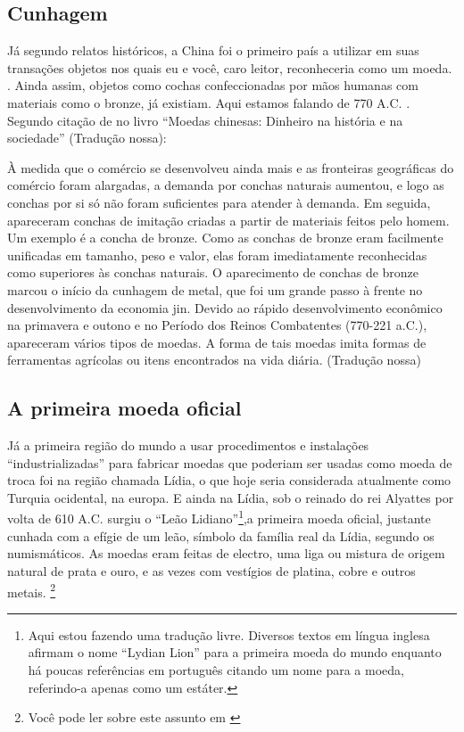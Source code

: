 \subsection{Cunhagem}
Já segundo relatos históricos, a China foi o primeiro país a utilizar em suas transações objetos nos quais eu e você, caro leitor, reconheceria como um moeda. . Ainda assim, objetos como cochas confeccionadas por mãos humanas com materiais como o bronze, já existiam. Aqui estamos falando de 770 A.C. . Segundo citação de \cite{CHINA} no livro ``Moedas chinesas: Dinheiro na história e na sociedade'' (Tradução nossa):

\begin{citacao}
 À medida que o comércio se desenvolveu ainda mais e as fronteiras geográficas do comércio foram alargadas, a demanda por conchas naturais aumentou, e logo as conchas por si só não foram suficientes para atender à demanda. Em seguida, apareceram conchas de imitação criadas a partir de materiais feitos pelo homem. Um exemplo é a concha de bronze. Como as conchas de bronze eram facilmente unificadas em tamanho, peso e valor, elas foram imediatamente reconhecidas como superiores às conchas naturais. O aparecimento de conchas de bronze marcou o início da cunhagem de metal, que foi um grande passo à frente no desenvolvimento da economia jin. Devido ao rápido desenvolvimento econômico na primavera e outono e no Período dos Reinos Combatentes (770-221 a.C.), apareceram vários tipos de moedas. A forma de tais moedas imita formas de ferramentas agrícolas ou itens encontrados na vida diária. (Tradução nossa)
	\end{citacao}

\subsection{A primeira moeda oficial}
Já a primeira região do mundo a usar procedimentos e instalações ``industrializadas'' para fabricar moedas que poderiam ser usadas como moeda de troca foi na região chamada Lídia, o que hoje seria considerada atualmente como Turquia ocidental, na europa. E ainda na Lídia, sob o reinado do rei Alyattes  por volta de 610 A.C. surgiu o  ``Leão Lidiano''\footnote{Aqui estou fazendo uma tradução livre. Diversos textos em língua inglesa afirmam o nome ``Lydian Lion'' para a primeira moeda do mundo enquanto há poucas referências em português citando um nome para a moeda, referindo-a apenas como um estáter.},a primeira moeda oficial, justante cunhada com a efígie de um leão, símbolo da família real da Lídia, segundo os numismáticos. As moedas eram feitas de electro, uma liga ou mistura de origem natural de prata e ouro, e as vezes com vestígios de platina, cobre e outros metais. \footnote{Você pode ler sobre este assunto em \cite{MONTEREY}}

